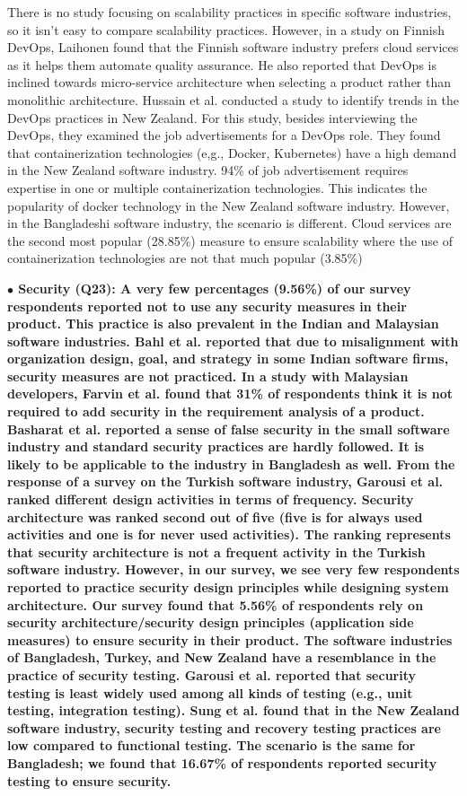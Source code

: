 There is no study focusing on scalability practices in specific software
industries, so it isn't easy to compare scalability practices. However, in a
study on Finnish DevOps, Laihonen\citep{Laihonen2018} found that the Finnish
software industry prefers cloud services as it helps them automate quality
assurance. He also reported that DevOps is inclined towards micro-service
architecture when selecting a product rather than monolithic architecture.
Hussain et al.\citep{Hussain2017} conducted a study to identify trends in the
DevOps practices in New Zealand. For this study, besides interviewing the
DevOps, they examined the job advertisements for a DevOps role. They found that
containerization technologies (e,g., Docker, Kubernetes) have a high demand in
the New Zealand software industry. 94\% of job advertisement requires expertise
in one or multiple containerization technologies. This indicates the popularity
of docker technology in the New Zealand software industry. However, in the
Bangladeshi software industry, the scenario is different. Cloud services are the
second most popular (28.85\%) measure to ensure scalability where the use of
containerization technologies are not that much popular (3.85\%)

\nd\bf{$\bullet$ Security (Q23):} A very few percentages (9.56\%) of our survey
respondents reported not to use any security measures in their product. This
practice is also prevalent in the Indian and Malaysian software industries. Bahl
et al.\citep{Bahl2011} reported that due to misalignment with organization
design, goal, and strategy in some Indian software firms, security measures are
not practiced. In a study with Malaysian developers, Farvin et
al.\citep{Farvin2016} found that 31\% of respondents think it is not required to
add security in the requirement analysis of a product. Basharat et
al.\citep{Basharat2013} reported a sense of false security in the small software
industry and standard security practices are hardly followed. It is likely to be
applicable to the industry in Bangladesh as well. From the response of a survey
on the Turkish software industry, Garousi et al.\citep{Garousi2015} ranked
different design activities in terms of frequency. Security architecture was
ranked second out of five (five is for always used activities and one is for
never used activities). The ranking represents that security architecture is not
a frequent activity in the Turkish software industry. However, in our survey, we
see very few respondents reported to practice security design principles while
designing system architecture. Our survey found that 5.56\% of respondents rely
on security architecture/security design principles (application side measures)
to ensure security in their product. The software industries of Bangladesh,
Turkey, and New Zealand have a resemblance in the practice of security testing.
Garousi et al.\citep{Garousi2015} reported that security testing is least widely
used among all kinds of testing (e.g., unit testing, integration testing). Sung
et al.\citep{Sung2006} found that in the New Zealand software industry, security
testing and recovery testing practices are low compared to functional testing.
The scenario is the same for Bangladesh; we found that 16.67\% of respondents
reported security testing to ensure security.

